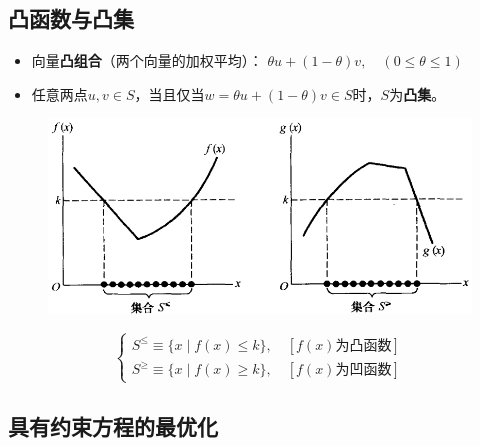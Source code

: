 \documentclass[12pt, a4paper, oneside]{article}
\begin{document}
\begin{CJK*}{UTF8}{gbsn}
\subsection{凸函数与凸集}
\begin{itemize}
	\item 
	向量\textbf{凸组合}（两个向量的加权平均）：
	$\theta u + (1-\theta)v,\quad (0 \leqslant \theta \leqslant 1)$
	\item 
	任意两点$u, v \in S$，当且仅当$w=\theta u+(1-\theta) v \in S$时，$S$为\textbf{凸集}。
\end{itemize}
\begin{figure}[htpb]
  \begin{center}
    \includegraphics[width=1 \linewidth]
    {pic/convex_set_and_concave_set.png}
  \end{center}
\end{figure}
$$
\left\{\begin{array}{l}
S^{\leqslant} \equiv\{x \mid f(x) \leqslant k\}, \quad[f(x)\text{为凸函数}]
\\
S^{\geqslant} \equiv\{x \mid f(x) \geqslant k\}, \quad[f(x)\text{为凹函数}]
\end{array}\right.
$$

%
\subsection{具有约束方程的最优化}

\end{CJK*}
\end{document}
